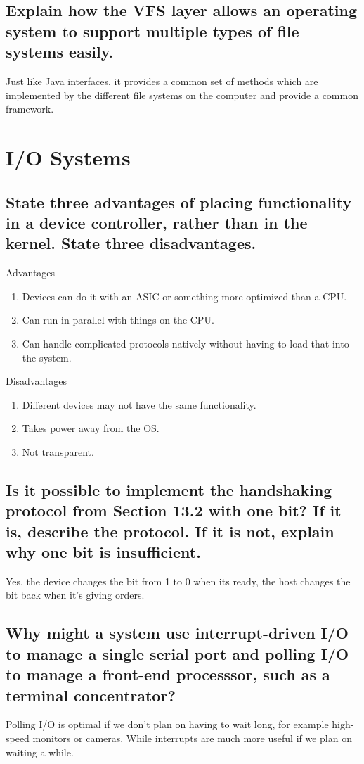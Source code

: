 \documentclass{book}%
\begin{document}
\section{Explain how the VFS layer allows an operating system to support multiple types of file systems easily.}
Just like Java interfaces, it provides a common set of methods which are implemented by the different file systems on the computer and provide a common framework.
\chapter{I/O Systems}
\section{State three advantages of placing functionality in a device controller, rather than in the kernel. State three disadvantages.}
Advantages
\begin{enumerate}
\item Devices can do it with an ASIC or something more optimized than a CPU.
\item Can run in parallel with things on the CPU.
\item Can handle complicated protocols natively without having to load that into the system.
\end{enumerate}
Disadvantages
\begin{enumerate}
\item Different devices may not have the same functionality.
\item Takes power away from the OS.
\item Not transparent.
\end{enumerate}
\section{Is it possible to implement the handshaking protocol from Section 13.2 with one bit? If it is, describe the protocol. If it is not, explain why one bit is insufficient.}
Yes, the device changes the bit from 1 to 0 when its ready, the host changes the bit back when it's giving orders.
\section{Why might a system use interrupt-driven I/O to manage a single serial port and polling I/O to manage a front-end processsor, such as a terminal concentrator?}
Polling I/O is optimal if we don't plan on having to wait long, for example high-speed monitors or cameras. While interrupts are much more useful if we plan on waiting a while.
\end{document}
